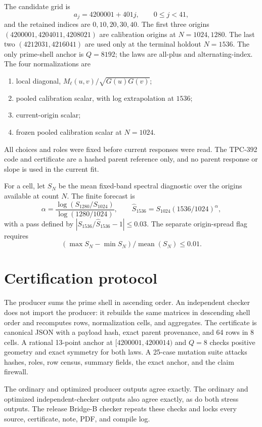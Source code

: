 \documentclass[10pt]{article}
\begin{document}
The candidate grid is
\[
 a_j=4200001+401j,\qquad 0\leq j<41,
\]
and the retained indices are $0,10,20,30,40$.  The first three origins
$(4200001,4204011,4208021)$ are calibration origins at $N=1024,1280$.
The last two $(4212031,4216041)$ are used only at the terminal holdout
$N=1536$.  The only prime-shell anchor is $Q=8192$; the laws are all-plus
and alternating-index.  The four normalizations are
\begin{enumerate}
\item local diagonal, $M_\ell(u,v)/\sqrt{G(u)G(v)}$;
\item pooled calibration scalar, with log extrapolation at $1536$;
\item current-origin scalar;
\item frozen pooled calibration scalar at $N=1024$.
\end{enumerate}
All choices and roles were fixed before current responses were read.  The
TPC-392 code and certificate are a hashed parent reference only, and no
parent response or slope is used in the current fit.

For a cell, let $S_N$ be the mean fixed-band spectral diagnostic over the
origins available at count $N$.  The finite forecast is
\[
 \alpha=\frac{\log(S_{1280}/S_{1024})}{\log(1280/1024)},
 \qquad \widehat S_{1536}=S_{1024}(1536/1024)^\alpha,
\]
with a pass defined by
$|S_{1536}/\widehat S_{1536}-1|\leq0.03$.
The separate origin-spread flag requires
\[
 (\max S_N-\min S_N)/\operatorname{mean}(S_N)\leq0.01.
\]

\section{Certification protocol}

The producer sums the prime shell in ascending order.  An independent checker
does not import the producer: it rebuilds the same matrices in descending
shell order and recomputes rows, normalization cells, and aggregates.  The
certificate is canonical JSON with a payload hash, exact parent provenance,
and 64 rows in 8 cells.  A rational 13-point anchor at
$[4200001,4200014)$ and $Q=8$ checks positive geometry and exact symmetry for
both laws.  A 25-case mutation suite attacks hashes, roles, row census,
summary fields, the exact anchor, and the claim firewall.

The ordinary and optimized producer outputs agree exactly.  The ordinary and
optimized independent-checker outputs also agree exactly, as do both stress
outputs.  The release Bridge-B checker repeats these checks and locks every
source, certificate, note, PDF, and compile log.
\end{document}
